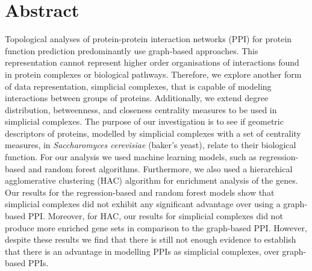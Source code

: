 \documentclass[9pt]{article}
\begin{document}
\section{Abstract}\label{sec:abstract}
Topological analyses of protein-protein interaction networks (PPI) for protein function prediction predominantly use graph-based approaches. This representation cannot represent higher order organisations of interactions found in protein complexes or biological pathways. Therefore, we explore another form of data representation, simplicial complexes, that is capable of modeling interactions between groups of proteins. Additionally, we extend degree distribution, betweenness, and closeness centrality measures to be used in simplicial complexes. The purpose of our investigation is to see if geometric descriptors of proteins, modelled by simplicial complexes with a set of centrality measures, in \textit{Saccharomyces cerevisiae} (baker’s yeast), relate to their biological function. For our analysis we used machine learning models, such as regression-based and random forest algorithms. Furthermore, we also used a hierarchical agglomerative clustering (HAC) algorithm for enrichment analysis of the genes. Our results for the regression-based and random forest models show that simplicial complexes did not exhibit any significant advantage over using a graph-based PPI. Moreover, for HAC, our results for simplicial complexes did not produce more enriched gene sets in comparison to the graph-based PPI. However, despite these results we find that there is still not enough evidence to establish that there is an advantage in modelling PPIs as simplicial complexes, over graph-based PPIs.
\end{document}
